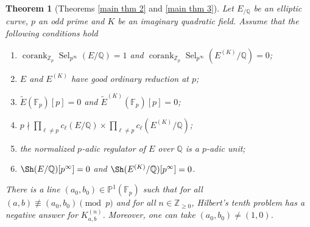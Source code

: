 \documentclass[12pt]{amsart}
\newtheorem{lthm}{Theorem}
\newcommand{\Z}{\mathbb{Z}}
\newcommand{\Q}{\mathbb{Q}}
\newcommand{\F}{\mathbb{F}}
\newcommand{\op}[1]{\operatorname{#1}}
\numberwithin{equation}{section}
\begin{document}
\begin{lthm}[Theorems \ref{main thm 2} and \ref{main thm 3}]
    Let $E_{/\Q}$ be an elliptic curve, $p$ an odd prime and $K$ be an imaginary quadratic field. Assume that the following conditions hold
    \begin{enumerate}
        \item $\op{corank}_{\Z_p} \op{Sel}_{p^\infty}(E/\Q)=1$ and $\op{corank}_{\Z_p} \op{Sel}_{p^\infty}(E^{(K)}/\Q)=0$;
        \item $E$ and $E^{(K)}$ have good ordinary reduction at $p$; 
        \item $\widetilde{E}(\F_p)[p]=0$ and $\widetilde{E}^{(K)}(\F_p)[p]=0$;
        \item $p\nmid \prod_{\ell\neq p} c_\ell(E/\Q)\times \prod_{\ell\neq p} c_\ell(E^{(K)}/\Q)$;
        \item the normalized $p$-adic regulator of $E$ over $\Q$ is a $p$-adic unit;
         \item $\Sh(E/\Q)[p^\infty]=0$ and $\Sh(E^{(K)}/\Q)[p^\infty]=0$.
    \end{enumerate}
    There is a line $(a_0, b_0)\in \mathbb{P}^1(\F_p)$ such that for all $(a,b)\not \equiv (a_0, b_0)\pmod{p}$ and for all $n\in \Z_{\geq 0}$, Hilbert's tenth problem has a negative answer for $K_{a,b}^{(n)}$. Moreover, one can take $(a_0, b_0)\neq (1, 0)$. 
\end{lthm}
\end{document}
